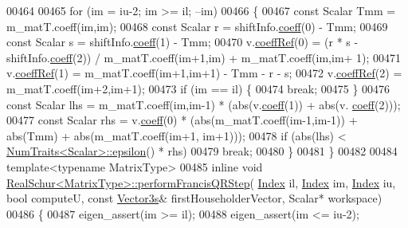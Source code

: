 \begin{DoxyCode}
00464 
00465   \textcolor{keywordflow}{for} (im = iu-2; im >= il; --im)
00466   \{
00467     \textcolor{keyword}{const} Scalar Tmm = m\_matT.coeff(im,im);
00468     \textcolor{keyword}{const} Scalar r = shiftInfo.\hyperlink{class_eigen_1_1_plain_object_base_afbfc12954f16d21aedb7bd839f64a278}{coeff}(0) - Tmm;
00469     \textcolor{keyword}{const} Scalar s = shiftInfo.\hyperlink{class_eigen_1_1_plain_object_base_afbfc12954f16d21aedb7bd839f64a278}{coeff}(1) - Tmm;
00470     v.\hyperlink{class_eigen_1_1_plain_object_base_a25626a55b26a4323565f79d1b7c48ea8}{coeffRef}(0) = (r * s - shiftInfo.\hyperlink{class_eigen_1_1_plain_object_base_afbfc12954f16d21aedb7bd839f64a278}{coeff}(2)) / m\_matT.coeff(im+1,im) + m\_matT.coeff(im,im+
      1);
00471     v.\hyperlink{class_eigen_1_1_plain_object_base_a25626a55b26a4323565f79d1b7c48ea8}{coeffRef}(1) = m\_matT.coeff(im+1,im+1) - Tmm - r - s;
00472     v.\hyperlink{class_eigen_1_1_plain_object_base_a25626a55b26a4323565f79d1b7c48ea8}{coeffRef}(2) = m\_matT.coeff(im+2,im+1);
00473     \textcolor{keywordflow}{if} (im == il) \{
00474       \textcolor{keywordflow}{break};
00475     \}
00476     \textcolor{keyword}{const} Scalar lhs = m\_matT.coeff(im,im-1) * (abs(v.\hyperlink{class_eigen_1_1_plain_object_base_afbfc12954f16d21aedb7bd839f64a278}{coeff}(1)) + abs(v.
      \hyperlink{class_eigen_1_1_plain_object_base_afbfc12954f16d21aedb7bd839f64a278}{coeff}(2)));
00477     \textcolor{keyword}{const} Scalar rhs = v.\hyperlink{class_eigen_1_1_plain_object_base_afbfc12954f16d21aedb7bd839f64a278}{coeff}(0) * (abs(m\_matT.coeff(im-1,im-1)) + abs(Tmm) + abs(m\_matT.coeff(im+1,
      im+1)));
00478     \textcolor{keywordflow}{if} (abs(lhs) < \hyperlink{group___core___module_struct_eigen_1_1_num_traits}{NumTraits<Scalar>::epsilon}() * rhs)
00479       \textcolor{keywordflow}{break};
00480   \}
00481 \}
00482 
00484 \textcolor{keyword}{template}<\textcolor{keyword}{typename} MatrixType>
00485 \textcolor{keyword}{inline} \textcolor{keywordtype}{void} \hyperlink{group___eigenvalues___module_class_eigen_1_1_real_schur}{RealSchur<MatrixType>::performFrancisQRStep}(
      \hyperlink{group___eigenvalues___module_a8bd4653e2d9569a44ecc95e746422d3f}{Index} il, \hyperlink{group___eigenvalues___module_a8bd4653e2d9569a44ecc95e746422d3f}{Index} im, \hyperlink{group___eigenvalues___module_a8bd4653e2d9569a44ecc95e746422d3f}{Index} iu, \textcolor{keywordtype}{bool} computeU, \textcolor{keyword}{const} \hyperlink{group___core___module}{Vector3s}& firstHouseholderVector,
       Scalar* workspace)
00486 \{
00487   eigen\_assert(im >= il);
00488   eigen\_assert(im <= iu-2);

\end{DoxyCode}
